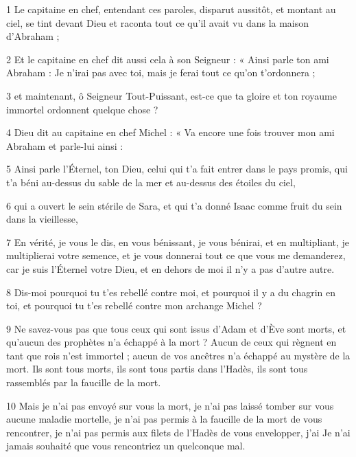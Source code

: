 
\par 1 Le capitaine en chef, entendant ces paroles, disparut aussitôt, et montant au ciel, se tint devant Dieu et raconta tout ce qu'il avait vu dans la maison d'Abraham ;

\par 2 Et le capitaine en chef dit aussi cela à son Seigneur : « Ainsi parle ton ami Abraham : Je n'irai pas avec toi, mais je ferai tout ce qu'on t'ordonnera ;

\par 3 et maintenant, ô Seigneur Tout-Puissant, est-ce que ta gloire et ton royaume immortel ordonnent quelque chose ?

\par 4 Dieu dit au capitaine en chef Michel : « Va encore une fois trouver mon ami Abraham et parle-lui ainsi :

\par 5 Ainsi parle l'Éternel, ton Dieu, celui qui t'a fait entrer dans le pays promis, qui t'a béni au-dessus du sable de la mer et au-dessus des étoiles du ciel,

\par 6 qui a ouvert le sein stérile de Sara, et qui t'a donné Isaac comme fruit du sein dans la vieillesse,

\par 7 En vérité, je vous le dis, en vous bénissant, je vous bénirai, et en multipliant, je multiplierai votre semence, et je vous donnerai tout ce que vous me demanderez, car je suis l'Éternel votre Dieu, et en dehors de moi il n'y a pas d'autre autre.

\par 8 Dis-moi pourquoi tu t'es rebellé contre moi, et pourquoi il y a du chagrin en toi, et pourquoi tu t'es rebellé contre mon archange Michel ?

\par 9 Ne savez-vous pas que tous ceux qui sont issus d'Adam et d'Ève sont morts, et qu'aucun des prophètes n'a échappé à la mort ? Aucun de ceux qui règnent en tant que rois n’est immortel ; aucun de vos ancêtres n’a échappé au mystère de la mort. Ils sont tous morts, ils sont tous partis dans l’Hadès, ils sont tous rassemblés par la faucille de la mort.

\par 10 Mais je n'ai pas envoyé sur vous la mort, je n'ai pas laissé tomber sur vous aucune maladie mortelle, je n'ai pas permis à la faucille de la mort de vous rencontrer, je n'ai pas permis aux filets de l'Hadès de vous envelopper, j'ai Je n'ai jamais souhaité que vous rencontriez un quelconque mal.

